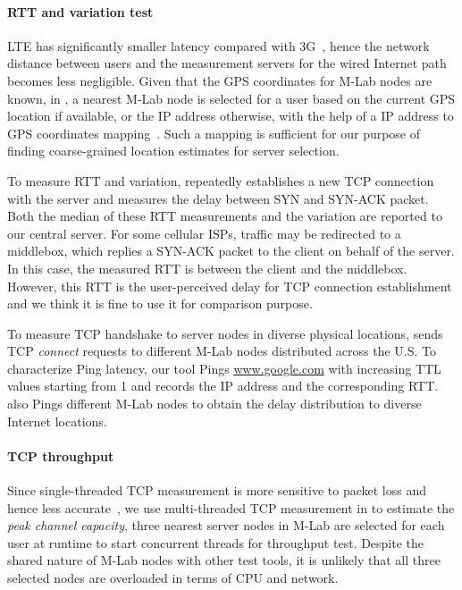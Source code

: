 \paragraph{RTT and variation test}
LTE has significantly smaller latency compared with 3G~\cite{tr25.913}, hence the network distance between users and the measurement servers for the wired Internet path becomes less negligible. Given that the GPS coordinates for M-Lab nodes are known, in \mobiperf, a nearest M-Lab node is selected for a user based on the current GPS location if available, or the IP address otherwise, with the help of a IP address to GPS coordinates mapping~\cite{maxmind}. Such a mapping is sufficient for our purpose of finding coarse-grained location estimates for server selection.

To measure RTT and variation, \mobiperf repeatedly establishes a new TCP connection with the server and measures the delay between {\sf SYN} and {\sf SYN-ACK} packet. Both the median of these RTT measurements and the variation are reported to our central server. For some cellular ISPs, traffic may be redirected to a middlebox, which replies a {\sf SYN-ACK} packet to the client on behalf of the server. In this case, the measured RTT is between the client and the middlebox. However, this RTT is the user-perceived delay for TCP connection establishment and we think it is fine to use it for comparison purpose.

To measure TCP handshake to server nodes in diverse physical locations, \mobiperf sends TCP {\em connect} requests to different M-Lab nodes distributed across the U.S. To characterize Ping latency, our tool Pings \url{www.google.com} with increasing TTL values starting from 1 and records the IP address and the corresponding RTT. \mobiperf also Pings different M-Lab nodes to obtain the delay distribution to diverse Internet locations. 

\paragraph{TCP throughput}
Since single-threaded TCP measurement is more sensitive to packet loss and hence less accurate~\cite{sigcomm.broadband}, we use multi-threaded TCP measurement in \mobiperf to estimate the {\em peak channel capacity}, \ie three nearest server nodes in M-Lab are selected for each user at runtime to start concurrent threads for throughput test. Despite the shared nature of M-Lab nodes with other test tools, it is unlikely that all three selected nodes are overloaded in terms of CPU and network.

